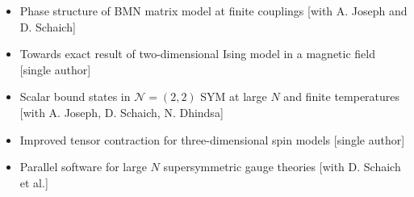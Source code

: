 \renewcommand{\arraystretch}{1.1}

	\begin{itemize}
	 \item Phase structure of BMN matrix model at finite couplings [with A. Joseph and D. Schaich] 
	 \item Towards exact result of two-dimensional Ising model in a magnetic field [single author] 
	 \item Scalar bound states in $\mathcal{N}=(2,2)$ SYM at large $N$ and finite temperatures [with A. Joseph, D. Schaich, N. Dhindsa] 
	 \item Improved tensor contraction for three-dimensional spin models [single author] 
	 \item Parallel software for large $N$ supersymmetric gauge theories [with D. Schaich et al.] 
	  \end{itemize}
